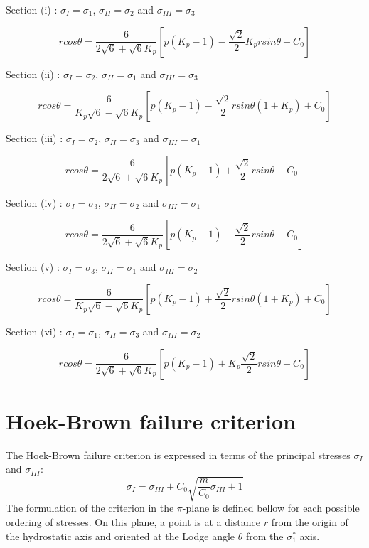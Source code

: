 Section (i) : $\sigma_I = \sigma_1$, $\sigma_{II} = \sigma_2$ and $\sigma_{III} = \sigma_3$

\begin{equation}
    r cos\theta = \frac{6}{2\sqrt{6}+\sqrt{6}K_p}\left[p(K_p-1)-\frac{\sqrt{2}}{2} K_p r sin\theta +C_0\right]
\end{equation}

Section (ii) : $\sigma_I = \sigma_2$, $\sigma_{II} = \sigma_1$ and $\sigma_{III} = \sigma_3$

\begin{equation}
    r cos\theta = \frac{6}{K_p \sqrt{6}-\sqrt{6}K_p}\left[p(K_p-1)-\frac{\sqrt{2}}{2} r sin\theta (1+K_p) +C_0\right]
\end{equation}

Section (iii) : $\sigma_I = \sigma_2$, $\sigma_{II} = \sigma_3$ and $\sigma_{III} = \sigma_1$

\begin{equation}
    r cos\theta = \frac{6}{2\sqrt{6}+\sqrt{6}K_p}\left[p(K_p-1)+\frac{\sqrt{2}}{2} r sin\theta -C_0\right]
\end{equation}

Section (iv) : $\sigma_I = \sigma_3$, $\sigma_{II} = \sigma_2$ and $\sigma_{III} = \sigma_1$

\begin{equation}
    r cos\theta = \frac{6}{2\sqrt{6}+\sqrt{6}K_p}\left[p(K_p-1)-\frac{\sqrt{2}}{2} r sin\theta -C_0\right]
\end{equation}

Section (v) : $\sigma_I = \sigma_3$, $\sigma_{II} = \sigma_1$ and $\sigma_{III} = \sigma_2$

\begin{equation}
    r cos\theta = \frac{6}{K_p \sqrt{6}-\sqrt{6}K_p}\left[p(K_p-1)+\frac{\sqrt{2}}{2} r sin\theta (1+K_p) +C_0\right]
\end{equation}

Section (vi) : $\sigma_I = \sigma_1$, $\sigma_{II} = \sigma_3$ and $\sigma_{III} = \sigma_2$

\begin{equation}
    r cos\theta = \frac{6}{2\sqrt{6}+\sqrt{6}K_p}\left[p(K_p-1)+K_p \frac{\sqrt{2}}{2} r sin\theta +C_0\right]
\end{equation}

\section*{Hoek-Brown failure criterion}
The Hoek-Brown failure criterion is expressed in terms of the principal stresses $\sigma_I$ and $\sigma_{III}$:
\begin{equation}
    \sigma_I = \sigma_{III} + C_0 \sqrt{\frac{m}{C_0} \sigma_{III}+1}
\end{equation}
The formulation of the criterion in the $\pi$-plane is defined bellow for each possible ordering of stresses. On this plane, a point is at a distance $r$ from the origin of the hydrostatic axis and oriented at the Lodge angle $\theta$ from the  $\sigma_1^*$ axis.

